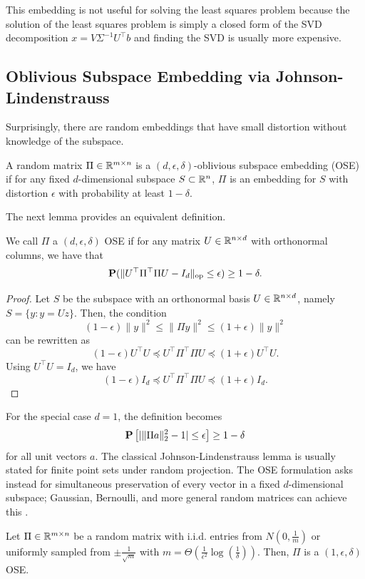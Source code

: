 This embedding is not useful for solving the least squares problem
because the solution of the least squares problem is simply a closed
form of the SVD decomposition $x=V\Sigma^{-1}U^{\top}b$ and finding
the SVD is usually more expensive.

\subsection{Oblivious Subspace Embedding via Johnson-Lindenstrauss}

Surprisingly, there are random embeddings that have small distortion
without knowledge of the subspace.
\begin{defn}
A random matrix $\Pi\in\R^{m\times n}$ is a $(d,\epsilon,\delta)$-oblivious
subspace embedding (OSE) if for any fixed $d$-dimensional subspace
$S\subset\R^{n}$, $\Pi$ is an embedding for $S$ with distortion
$\epsilon$ with probability at least $1-\delta$.
\end{defn}

The next lemma provides an equivalent definition.
\begin{lem}
We call $\Pi$ a $(d,\epsilon,\delta)$ OSE if for any matrix $U\in\R^{n\times d}$
with orthonormal columns, we have that
\[
\P(\|U^{\top}\Pi^{\top}\Pi U-I_{d}\|_{\op}\leq\epsilon)\geq1-\delta.
\]
\end{lem}

\begin{proof}
Let $S$ be the subspace with an orthonormal basis $U\in\R^{n\times d}$,
namely $S=\{y:y=Uz\}$. Then, the condition
\[
(1-\epsilon)\|y\|^{2}\leq\|\Pi y\|^{2}\leq(1+\epsilon)\|y\|^{2}
\]
can be rewritten as
\[
(1-\epsilon)U^{\top}U\preceq U^{\top}\Pi^{\top}\Pi U\preceq(1+\epsilon)U^{\top}U.
\]
Using $U^{\top}U=I_{d}$, we have
\[
(1-\epsilon)I_{d}\preceq U^{\top}\Pi^{\top}\Pi U\preceq(1+\epsilon)I_{d}.
\]
\end{proof}
For the special case $d=1$, the definition becomes
\[
\P\left[|\|\Pi a\|^{2}_{2}-1|\leq\epsilon\right]\geq1-\delta
\]
for all unit vectors $a$. The classical Johnson-Lindenstrauss lemma
is usually stated for finite point sets under random projection. The
OSE formulation asks instead for simultaneous preservation of every
vector in a fixed $d$-dimensional subspace; Gaussian, Bernoulli,
and more general random matrices can achieve this \cite{Vempala04}.
\begin{lem}
Let $\Pi\in\R^{m\times n}$ be a random matrix with i.i.d. entries
from $N(0,\frac{1}{m})$ or uniformly sampled from $\pm\frac{1}{\sqrt{m}}$
with $m=\Theta(\frac{1}{\epsilon^{2}}\log(\frac{1}{\delta}))$. Then,
$\Pi$ is a $(1,\epsilon,\delta)$ OSE.
\end{lem}


